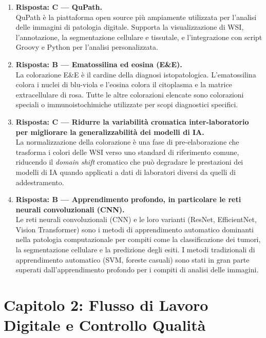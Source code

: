 \begin{enumerate}
    \item \textbf{Risposta: C --- QuPath.}\\
    QuPath è la piattaforma open source più ampiamente utilizzata per l'analisi delle immagini di
    patologia digitale. Supporta la visualizzazione di WSI, l'annotazione, la segmentazione
    cellulare e tissutale, e l'integrazione con script Groovy e Python per l'analisi
    personalizzata.

    \item \textbf{Risposta: B --- Ematossilina ed eosina (E\&E).}\\
    La colorazione E\&E è il cardine della diagnosi istopatologica. L'ematossilina colora i nuclei
    di blu-viola e l'eosina colora il citoplasma e la matrice extracellulare di rosa. Tutte le
    altre colorazioni elencate sono colorazioni speciali o immunoistochimiche utilizzate per scopi
    diagnostici specifici.

    \item \textbf{Risposta: C --- Ridurre la variabilità cromatica inter-laboratorio per migliorare
    la generalizzabilità dei modelli di IA.}\\
    La normalizzazione della colorazione è una fase di pre-elaborazione che trasforma i colori
    delle WSI verso uno standard di riferimento comune, riducendo il \emph{domain shift} cromatico
    che può degradare le prestazioni dei modelli di IA quando applicati a dati di laboratori
    diversi da quelli di addestramento.

    \item \textbf{Risposta: B --- Apprendimento profondo, in particolare le reti neurali
    convoluzionali (CNN).}\\
    Le reti neurali convoluzionali (CNN) e le loro varianti (ResNet, EfficientNet, Vision
    Transformer) sono i metodi di apprendimento automatico dominanti nella patologia computazionale
    per compiti come la classificazione dei tumori, la segmentazione cellulare e la predizione
    degli esiti. I metodi tradizionali di apprendimento automatico (SVM, foreste casuali) sono
    stati in gran parte superati dall'apprendimento profondo per i compiti di analisi delle
    immagini.

\end{enumerate}

\section*{Capitolo 2: Flusso di Lavoro Digitale e Controllo Qualità}

